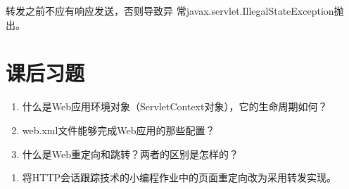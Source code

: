 
转发之前不应有响应发送，否则导致异
常javax.servlet.IllegalStateException抛出。


\section{课后习题}


\begin{enumerate}
\item 什么是Web应用环境对象（ServletContext对象），它的生命周期如何？
\item web.xml文件能够完成Web应用的那些配置？
\item 什么是Web重定向和跳转？两者的区别是怎样的？
\end{enumerate}


\begin{enumerate}
\item 将HTTP会话跟踪技术的小编程作业中的页面重定向改为采用转发实现。
\end{enumerate}

